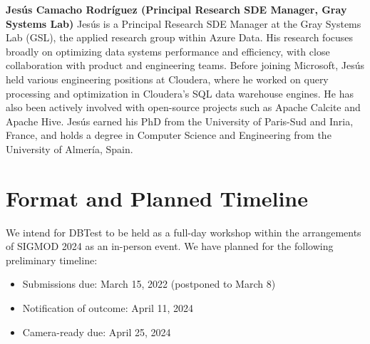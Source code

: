 \documentclass[sigconf]{acmart}
\begin{document}
\textbf{Jesús Camacho Rodríguez (Principal Research SDE Manager, Gray Systems Lab)}
Jesús is a Principal Research SDE Manager at the Gray Systems Lab (GSL), the applied research group within Azure Data. His research focuses broadly on optimizing data systems performance and efficiency, with close collaboration with product and engineering teams.
Before joining Microsoft, Jesús held various engineering positions at Cloudera, where he worked on query processing and optimization in Cloudera’s SQL data warehouse engines. He has also been actively involved with open-source projects such as Apache Calcite and Apache Hive.
Jesús earned his PhD from the University of Paris-Sud and Inria, France, and holds a degree in Computer Science and Engineering from the University of Almería, Spain.

\section{Format and Planned Timeline}

We intend for DBTest to be held as a full-day workshop within the arrangements of SIGMOD 2024 as an in-person event.
We have planned for the following preliminary timeline:
\begin{itemize}
    \item Submissions due: March 15, 2022 (postponed to March 8)
    \item Notification of outcome: April 11, 2024
    \item Camera-ready due: April 25, 2024
\end{itemize}
\end{document}
